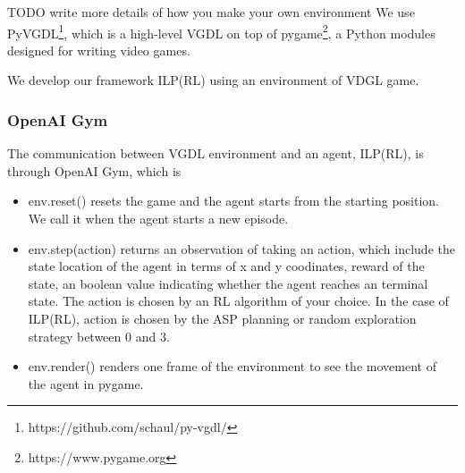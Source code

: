 TODO write more details of how you make your own environment
We use PyVGDL\footnote{https://github.com/schaul/py-vgdl/}, which is a high-level VGDL on top of pygame\footnote{https://www.pygame.org}, 
a Python modules designed for writing video games.


We develop our framework ILP(RL) using an environment of VDGL game.

\subsubsection{OpenAI Gym}
The communication between VGDL environment and an agent, ILP(RL), is through OpenAI Gym, which is 



\begin{itemize}
\item \textsf{env.reset()} resets the game and the agent starts from the starting position. We call it when the agent starts a new episode.
\item \textsf{env.step(action)} returns an observation of taking an action, which include the state location of the agent in terms of x and y coodinates, reward of the state, an boolean value indicating whether the agent reaches an terminal state.
The action is chosen by an RL algorithm of your choice. In the case of ILP(RL), action is chosen by the ASP planning or random exploration strategy between 0 and 3.
\item \textsf{env.render()} renders one frame of the environment to see the movement of the agent in pygame.
\end{itemize}









